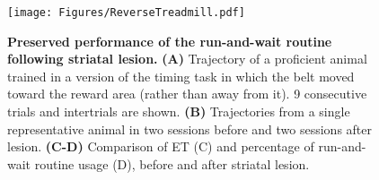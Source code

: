 \begin{figure}[h!]
 \begin{center}
	\texttt{[image: Figures/ReverseTreadmill.pdf]}
	\caption
	{\textbf{Preserved performance of the run-and-wait routine following striatal lesion.}
	\textbf{(A)} Trajectory of a proficient animal trained in a version of the timing task in which the belt moved toward the reward area (rather than away from it). 9 consecutive trials and intertrials are shown.
	\textbf{(B)} Trajectories from a single representative animal in two sessions before and two sessions after lesion.
	\textbf{(C-D)} Comparison of ET (C) and percentage of run-and-wait routine usage (D), before and after striatal lesion.
	}
	\label{fig2}
 \end{center}
\end{figure}
